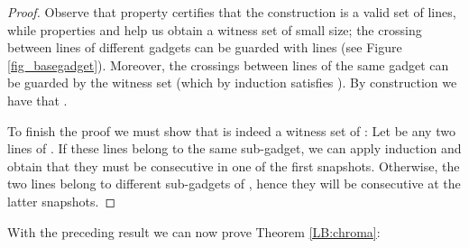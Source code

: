 \documentclass[11pt,a4paper]{article}
\begin{document}
\begin{proof}
Observe that property  certifies that the construction is a valid set of lines, while properties  and  help us obtain a witness set  of small size; the crossing between lines of different gadgets  can be guarded with  lines (see Figure \ref{fig_basegadget}). Moreover, the crossings between lines of the same gadget can be guarded by the witness set  (which by induction satisfies ). By construction we have that .

To finish the proof we must show that  is indeed a witness set of : Let  be any two lines of . If these lines belong to the same sub-gadget, we can apply induction and obtain that they must be consecutive in one of the first snapshots. Otherwise, the two lines belong to different sub-gadgets of , hence they will be consecutive at the latter snapshots.
\end{proof}

With the preceding result we can now prove Theorem \ref{LB:chroma}:
\end{document}
